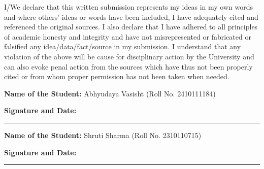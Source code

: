 
I/We declare that this written submission represents my ideas in my own words and
where others' ideas or words have been included, I have adequately cited and
referenced the original sources. I also declare that I have adhered to all
principles of academic honesty and integrity and have not misrepresented or
fabricated or falsified any idea/data/fact/source in my submission. I understand
that any violation of the above will be cause for disciplinary action by the
University and can also evoke penal action from the sources which have thus not been
properly cited or from whom proper permission has not been taken when needed.

\vspace{2cm}
\noindent\textbf{Name of the Student:} Abhyudaya Vasisht (Roll No. 2410111184)\par
\vspace{1.5cm}
\noindent\textbf{Signature and Date:} \rule{6cm}{0.4pt}\par
\vspace{1.5cm}
\noindent\textbf{Name of the Student:} Shruti Sharma (Roll No. 2310110715)\par
\vspace{1.5cm}
\noindent\textbf{Signature and Date:} \rule{6cm}{0.4pt}\par
